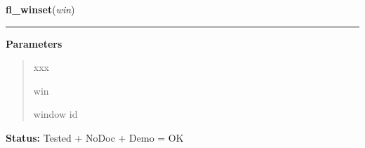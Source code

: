     \label{xformslib:library:fl_winset}

    \vspace{0.5ex}

\hspace{.8\funcindent}\begin{boxedminipage}{\funcwidth}

    \raggedright \textbf{fl\_winset}(\textit{win})

    \vspace{-1.5ex}

    \rule{\textwidth}{0.5\fboxrule}
\setlength{\parskip}{2ex}
\setlength{\parskip}{1ex}
      \textbf{Parameters}
      \vspace{-1ex}

      \begin{quote}
        \begin{Ventry}{xxx}

          \item[win]

          window id

        \end{Ventry}

      \end{quote}

\textbf{Status:} Tested + NoDoc + Demo = OK



    \end{boxedminipage}

    \label{xformslib:library:fl_winreparent}

    \vspace{0.5ex}

